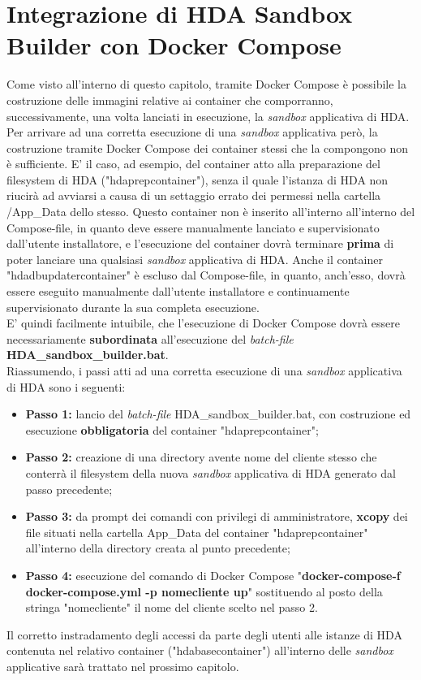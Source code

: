 \section{Integrazione di HDA Sandbox Builder con Docker Compose}
Come visto all'interno di questo capitolo, tramite Docker Compose è possibile la costruzione delle immagini relative ai container che comporranno, successivamente, una volta lanciati in esecuzione, la \textit{sandbox} applicativa di HDA. Per arrivare ad una corretta esecuzione di una \textit{sandbox} applicativa però, la costruzione tramite Docker Compose dei container stessi che la compongono non è sufficiente. E' il caso, ad esempio, del container atto alla preparazione del filesystem di HDA ("hdaprepcontainer"), senza il quale l'istanza di HDA non riucirà ad avviarsi a causa di un settaggio errato dei permessi nella cartella /App\_Data dello stesso. Questo container non è inserito all'interno all'interno del Compose-file, in quanto deve essere manualmente lanciato e supervisionato dall'utente installatore, e l'esecuzione del container dovrà terminare \textbf{prima} di poter lanciare una qualsiasi \textit{sandbox} applicativa di HDA. Anche il container "hdadbupdatercontainer" è escluso dal Compose-file, in quanto, anch'esso, dovrà essere eseguito manualmente dall'utente installatore e continuamente supervisionato durante la sua completa esecuzione.\\
E' quindi facilmente intuibile, che l'esecuzione di Docker Compose dovrà essere necessariamente \textbf{subordinata} all'esecuzione del \textit{batch-file} \textbf{HDA\_sandbox\_builder.bat}.\\
Riassumendo, i passi atti ad una corretta esecuzione di una \textit{sandbox} applicativa di HDA sono i seguenti:
\begin{itemize}
	\item \textbf{Passo 1:} lancio del \textit{batch-file} HDA\_sandbox\_builder.bat, con costruzione ed esecuzione \textbf{obbligatoria} del container "hdaprepcontainer";
	\item \textbf{Passo 2:} creazione di una directory avente nome del cliente stesso che conterrà il filesystem della nuova \textit{sandbox} applicativa di HDA generato dal passo precedente;
	\item \textbf{Passo 3:} da prompt dei comandi con privilegi di amministratore, \textbf{xcopy} dei file situati nella cartella App\_Data del container "hdaprepcontainer" all'interno della directory creata al punto precedente;
	\item \textbf{Passo 4:} esecuzione del comando di Docker Compose "\textbf{docker-compose-f docker-compose.yml -p nomecliente up}" sostituendo al posto della stringa "nomecliente" il nome del cliente scelto nel passo 2.
\end{itemize}
Il corretto instradamento degli accessi da parte degli utenti alle istanze di HDA contenuta nel relativo container ("hdabasecontainer") all'interno delle \textit{sandbox} applicative sarà trattato nel prossimo capitolo.







